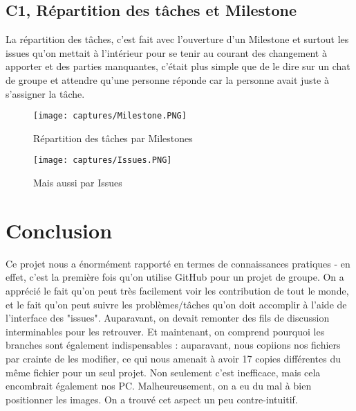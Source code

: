 \documentclass{article}
\begin{document}
\subsection{C1, Répartition des tâches et Milestone}
La répartition des tâches, c'est fait avec l'ouverture d'un Milestone et surtout les issues qu'on mettait à l'intérieur pour se tenir au courant des changement à apporter et des parties manquantes, c'était plus simple que de le dire sur un chat de groupe et attendre qu'une personne réponde car la personne avait juste à s'assigner la tâche.

\begin{figure}[H]
    \centering
    \texttt{[image: captures/Milestone.PNG]}
    \caption{Répartition des tâches par Milestones}
    \label{Miles}
\end{figure}

\begin{figure}[H]
    \centering
    \texttt{[image: captures/Issues.PNG]}
    \caption{Mais aussi par Issues}
    \label{Iss}
\end{figure}

\section{Conclusion}
Ce projet nous a énormément rapporté en termes de connaissances pratiques - en effet, c'est la première fois qu'on utilise GitHub pour un projet de groupe. On a apprécié le fait qu'on peut très facilement voir les contribution de tout le monde, et le fait qu'on peut suivre les problèmes/tâches qu'on doit accomplir à l'aide de l'interface des "issues". Auparavant, on devait remonter des fils de discussion interminables pour les retrouver.  
Et maintenant, on comprend pourquoi les branches sont également indispensables : auparavant, nous copiions nos fichiers par crainte de les modifier, ce qui nous amenait à avoir 17 copies différentes du même fichier pour un seul projet. Non seulement c'est inefficace, mais cela encombrait également nos PC.
Malheureusement, on a eu du mal à bien positionner les images. On a trouvé cet aspect un peu contre-intuitif. 
\end{document}

